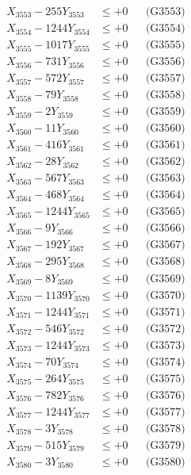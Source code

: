 \documentclass[a4paper,10pt]{article}
\begin{document}
{\begin{align}
X_{3553} - 255Y_{3553} &\leq +0 && \text{(G3553)} \\
X_{3554} - 1244Y_{3554} &\leq +0 && \text{(G3554)} \\
X_{3555} - 1017Y_{3555} &\leq +0 && \text{(G3555)} \\
X_{3556} - 731Y_{3556} &\leq +0 && \text{(G3556)} \\
X_{3557} - 572Y_{3557} &\leq +0 && \text{(G3557)} \\
X_{3558} - 79Y_{3558} &\leq +0 && \text{(G3558)} \\
X_{3559} - 2Y_{3559} &\leq +0 && \text{(G3559)} \\
X_{3560} - 11Y_{3560} &\leq +0 && \text{(G3560)} \\
\allowbreak
X_{3561} - 416Y_{3561} &\leq +0 && \text{(G3561)} \\
X_{3562} - 28Y_{3562} &\leq +0 && \text{(G3562)} \\
X_{3563} - 567Y_{3563} &\leq +0 && \text{(G3563)} \\
X_{3564} - 468Y_{3564} &\leq +0 && \text{(G3564)} \\
X_{3565} - 1244Y_{3565} &\leq +0 && \text{(G3565)} \\
X_{3566} - 9Y_{3566} &\leq +0 && \text{(G3566)} \\
X_{3567} - 192Y_{3567} &\leq +0 && \text{(G3567)} \\
X_{3568} - 295Y_{3568} &\leq +0 && \text{(G3568)} \\
X_{3569} - 8Y_{3569} &\leq +0 && \text{(G3569)} \\
X_{3570} - 1139Y_{3570} &\leq +0 && \text{(G3570)} \\
\allowbreak
X_{3571} - 1244Y_{3571} &\leq +0 && \text{(G3571)} \\
X_{3572} - 546Y_{3572} &\leq +0 && \text{(G3572)} \\
X_{3573} - 1244Y_{3573} &\leq +0 && \text{(G3573)} \\
X_{3574} - 70Y_{3574} &\leq +0 && \text{(G3574)} \\
X_{3575} - 264Y_{3575} &\leq +0 && \text{(G3575)} \\
X_{3576} - 782Y_{3576} &\leq +0 && \text{(G3576)} \\
X_{3577} - 1244Y_{3577} &\leq +0 && \text{(G3577)} \\
X_{3578} - 3Y_{3578} &\leq +0 && \text{(G3578)} \\
X_{3579} - 515Y_{3579} &\leq +0 && \text{(G3579)} \\
X_{3580} - 3Y_{3580} &\leq +0 && \text{(G3580)} \\

\end{align}}
\end{document}
